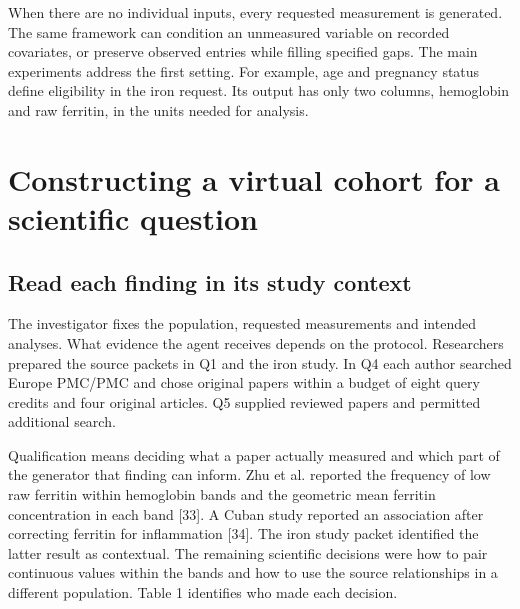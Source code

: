 \documentclass[sigconf,review]{acmart}
\begin{document}
When there are no individual inputs, every requested measurement is generated. The same framework can condition an unmeasured variable on recorded covariates, or preserve observed entries while filling specified gaps. The main experiments address the first setting. For example, age and pregnancy status define eligibility in the iron request. Its output has only two columns, hemoglobin and raw ferritin, in the units needed for analysis.


\section{Constructing a virtual cohort for a scientific question}

\subsection{Read each finding in its study context}

The investigator fixes the population, requested measurements and intended analyses. What evidence the agent receives depends on the protocol. Researchers prepared the source packets in Q1 and the iron study. In Q4 each author searched Europe PMC/\allowbreak{}PMC and chose original papers within a budget of eight query credits and four original articles. Q5 supplied reviewed papers and permitted additional search.


Qualification means deciding what a paper actually measured and which part of the generator that finding can inform. Zhu et al. reported the frequency of low raw ferritin within hemoglobin bands and the geometric mean ferritin concentration in each band [33]. A Cuban study reported an association after correcting ferritin for inflammation [34]. The iron study packet identified the latter result as contextual. The remaining scientific decisions were how to pair continuous values within the bands and how to use the source relationships in a different population. Table 1 identifies who made each decision.
\end{document}
